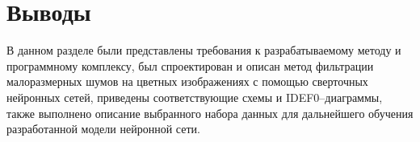\section{Выводы}

В данном разделе были представлены требования к разрабатываемому методу и программному комплексу, был спроектирован и описан метод фильтрации малоразмерных шумов на цветных изображениях с помощью сверточных нейронных сетей, приведены соответствующие схемы и IDEF0--диаграммы, также выполнено описание выбранного набора данных для дальнейшего обучения разработанной модели нейронной сети. 